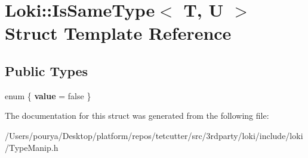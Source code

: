 \hypertarget{structLoki_1_1IsSameType}{}\section{Loki\+:\+:Is\+Same\+Type$<$ T, U $>$ Struct Template Reference}
\label{structLoki_1_1IsSameType}
\subsection*{Public Types}
\begin{DoxyCompactItemize}
\item 
\hypertarget{structLoki_1_1IsSameType_abc5da3b36ee521dd7720020168ccd622}{}enum \{ {\bfseries value} = false
 \}\label{structLoki_1_1IsSameType_abc5da3b36ee521dd7720020168ccd622}

\end{DoxyCompactItemize}


The documentation for this struct was generated from the following file\+:\begin{DoxyCompactItemize}
\item 
/\+Users/pourya/\+Desktop/platform/repos/tetcutter/src/3rdparty/loki/include/loki/Type\+Manip.\+h\end{DoxyCompactItemize}
